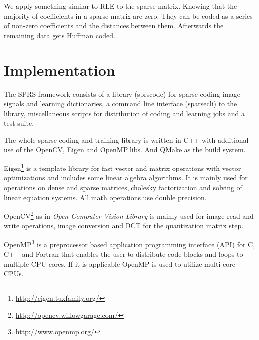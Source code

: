 We apply something similar to RLE to the sparse matrix. Knowing that the
majority of coefficients in a sparse matrix are zero. They can be coded
as a series of non-zero coefficients and the distances between them.
Afterwards the remaining data gets Huffman coded.





\section{Implementation}
The SPRS framework consists of a library (sprscode) for sparse coding image
signals and learning dictionaries, a command line interface (sparsecli) to the
library, miscellaneous scripts for distribution of coding and learning jobs
and a test suite.

The whole sparse coding and training library is written in C++ with
additional use of the OpenCV, Eigen and OpenMP libs. And QMake as the build
system. 

Eigen\footnote{\url{http://eigen.tuxfamily.org/}}
is a template library for fast vector and matrix operations with vector
optimizations and includes some linear algebra algorithms. It is mainly used for
operations on dense and sparse matrices, cholesky factorization and solving of
linear equation systems. All math operations use double precision. 

OpenCV\footnote{\url{http://opencv.willowgarage.com/}} as
in \emph{Open Computer Vision Library} is mainly used for
image read and write operations, image conversion and DCT for the
quantization matrix step. 

OpenMP\footnote{\url{http://www.openmp.org/}} is a preprocessor
based application programming interface (API) for C, C++ and Fortran that
enables the user to distribute code blocks and loops to multiple CPU cores. If
it is applicable OpenMP is used to utilize multi-core CPUs. 



